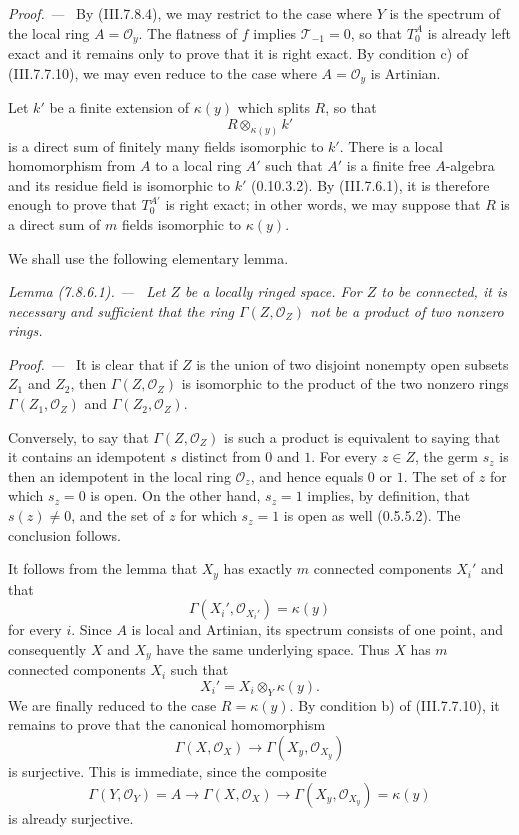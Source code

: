 \documentclass[10pt,oneside]{book}
\newcommand{\sh}[1]{\mathscr{#1}}
\newcommand{\kres}{\kappa}
\newcommand{\sref}[2][]{(#2)}
\newcommand{\oldpage}[2][]{\setcounter{footnote}{0}\marginpar{\scriptsize\textbf{#1}~|~#2}\ignorespaces}
\newenvironment{lemma}[1][]{\par\medskip\noindent\itshape Lemma (#1). ---\ }{\par}
\newenvironment{proof}{\par\medskip\noindent\textit{Proof. ---\ }}{\par}
\begin{document}
\begin{proof}
By \sref{III.7.8.4}, we may restrict to the case where
$Y$ is the spectrum of the local ring $A=\sh{O}_y$.
The flatness of $f$ implies $\sh{T}_{-1}=0$, so that
$T_0^A$ is already left exact and it remains only to prove
that it is right exact.  By condition c) of
\sref{III.7.7.10}, we may even reduce to the case where
$A=\sh{O}_y$ is Artinian.

Let $k'$ be a finite extension of $\kres(y)$ which splits
$R$, so that
\[
  R\otimes_{\kres(y)}k'
\]
is a direct sum of finitely many fields isomorphic to $k'$.
There is a local homomorphism from $A$ to a local ring
$A'$ such that $A'$ is a finite free $A$-algebra and its
residue field is isomorphic to $k'$ \sref[0]{0.10.3.2}.
By \sref{III.7.6.1}, it is therefore enough to prove that
$T_0^{A'}$ is right exact; in other words, we may suppose
that $R$ is a direct sum of $m$ fields isomorphic to
$\kres(y)$.

We shall use the following elementary lemma.

\begin{lemma}[7.8.6.1]
\label{III.7.8.6.1}
Let $Z$ be a locally ringed space.  For $Z$ to be connected,
\oldpage[III]{207}
it is necessary and sufficient that the ring
$\Gamma(Z,\sh{O}_Z)$ not be a product of two nonzero rings.
\end{lemma}

\begin{proof}
It is clear that if $Z$ is the union of two disjoint
nonempty open subsets $Z_1$ and $Z_2$, then
$\Gamma(Z,\sh{O}_Z)$ is isomorphic to the product of the
two nonzero rings $\Gamma(Z_1,\sh{O}_Z)$ and
$\Gamma(Z_2,\sh{O}_Z)$.

Conversely, to say that $\Gamma(Z,\sh{O}_Z)$ is such a
product is equivalent to saying that it contains an
idempotent $s$ distinct from $0$ and $1$.  For every
$z\in Z$, the germ $s_z$ is then an idempotent in the local
ring $\sh{O}_z$, and hence equals $0$ or $1$.  The set of
$z$ for which $s_z=0$ is open.  On the other hand,
$s_z=1$ implies, by definition, that $s(z)\ne0$, and the
set of $z$ for which $s_z=1$ is open as well
\sref[0]{0.5.5.2}.  The conclusion follows.
\end{proof}

It follows from the lemma that $X_y$ has exactly $m$
connected components $X_i'$ and that
\[
  \Gamma(X_i',\sh{O}_{X_i'})=\kres(y)
\]
for every $i$.  Since $A$ is local and Artinian, its
spectrum consists of one point, and consequently $X$ and
$X_y$ have the same underlying space.  Thus $X$ has $m$
connected components $X_i$ such that
\[
  X_i'=X_i\otimes_Y\kres(y).
\]
We are finally reduced to the case $R=\kres(y)$.  By
condition b) of \sref{III.7.7.10}, it remains to prove that
the canonical homomorphism
\[
  \Gamma(X,\sh{O}_X)\longrightarrow
  \Gamma(X_y,\sh{O}_{X_y})
\]
is surjective.  This is immediate, since the composite
\[
  \Gamma(Y,\sh{O}_Y)=A
  \longrightarrow\Gamma(X,\sh{O}_X)
  \longrightarrow\Gamma(X_y,\sh{O}_{X_y})=\kres(y)
\]
is already surjective.
\end{proof}
\end{document}
